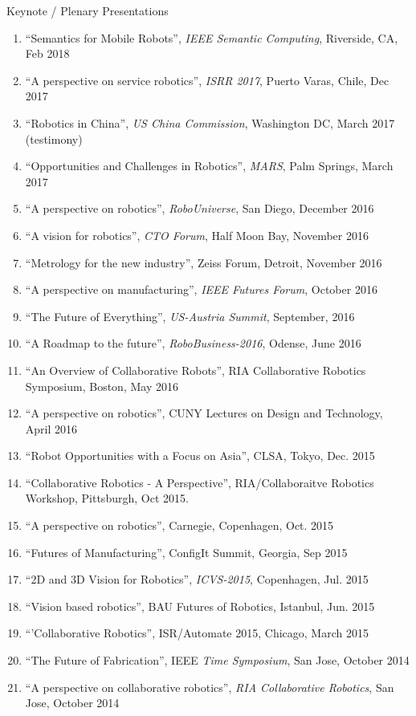 \documentclass{article}
\begin{document}
\begin{cv}
\begin{cvlist}{Keynote / Plenary Presentations}
\begin{enumerate}
  \item ``Semantics for Mobile Robots'', {\em IEEE Semantic Computing}, Riverside, CA, Feb 2018
  \item ``A perspective on service robotics'', {\em ISRR 2017}, Puerto Varas, Chile, Dec 2017
  \item ``Robotics in China'', {\em US China Commission}, Washington DC, March 2017 (testimony)
  \item ``Opportunities and Challenges in Robotics'', {\em MARS}, Palm Springs, March 2017
  \item ``A perspective on robotics'', {\em RoboUniverse}, San Diego,  December 2016
  \item ``A vision for robotics'', {\em CTO Forum}, Half Moon Bay, November 2016
  \item ``Metrology for the new industry'', Zeiss Forum, Detroit,  November 2016
  \item ``A perspective on manufacturing'', {\em IEEE Futures Forum},  October 2016
  \item ``The Future of Everything'', {\em US-Austria Summit},  September, 2016
  \item ``A Roadmap to the future'', {\em RoboBusiness-2016}, Odense,  June 2016
  \item ``An Overview of Collaborative Robots'', RIA Collaborative Robotics Symposium, Boston, May 2016
  \item ``A perspective on robotics'', CUNY Lectures on Design and Technology, April 2016
  \item ``Robot Opportunities with a Focus on Asia'', CLSA, Tokyo,  Dec. 2015
  \item ``Collaborative Robotics - A Perspective'', RIA/Collaboraitve Robotics Workshop, Pittsburgh, Oct 2015.
  \item ``A perspective on robotics'', Carnegie, Copenhagen, Oct. 2015
  \item ``Futures of Manufacturing'', ConfigIt Summit, Georgia, Sep 2015
  \item ``2D and 3D Vision for Robotics'', {\em ICVS-2015}, Copenhagen, Jul. 2015
  \item ``Vision based robotics'', BAU Futures of Robotics, Istanbul, Jun. 2015
  \item ``'Collaborative Robotics'', ISR/Automate 2015, Chicago, March 2015
  \item ``The Future of Fabrication'', IEEE {\em Time Symposium}, San Jose, October 2014
  \item ``A perspective on collaborative robotics'', {\em RIA Collaborative Robotics}, San Jose, October 2014

\end{enumerate}
\end{cvlist}
\end{cv}
\end{document}
